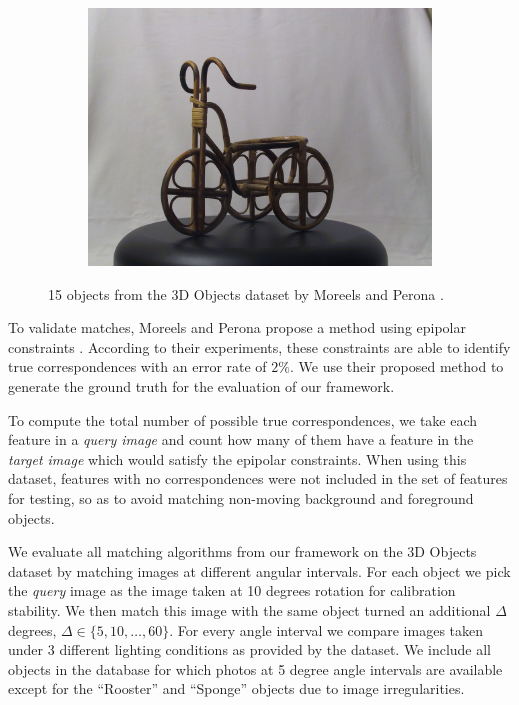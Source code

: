 \documentclass[runningheads]{llncs}
\begin{document}
\begin{figure}[htb]
\begin{subfigure}[t]{0.15\columnwidth}
        \includegraphics[width=1\columnwidth]{images/3d/15}
    \end{subfigure}%
    \vspace{1.5 mm}

    \caption{15 objects from the 3D Objects dataset by Moreels
    and Perona \cite{moreels2007evaluation}.}
    \label{fig:3d_objects}
\end{figure}

To validate matches, Moreels and Perona propose a method using epipolar constraints \cite[p.266]{moreels2007evaluation}.  According to their experiments, these constraints are able to identify true correspondences with an error rate of $2\%$. We use their proposed method to generate the ground truth for the evaluation of our framework.

To compute the total number of possible true correspondences, we take each feature in a \emph{query image} and count how many of them have a feature in the \emph{target image} which would satisfy the epipolar constraints. When using this dataset, features with no correspondences were not included in the set of features for testing, so as to avoid matching non-moving background and foreground objects.

We evaluate all matching algorithms from our framework on the 3D Objects dataset by matching images at different angular intervals. For each object we pick the \emph{query} image as the image taken at 10 degrees rotation for calibration stability.  We then match this image with the same object turned an additional $\Delta$ degrees, $\Delta \in \{5, 10, \ldots, 60\}$.  For every angle interval we compare images taken under 3 different lighting conditions as provided by the dataset. We include all objects in the database for which photos at 5 degree angle intervals are available except for the ``Rooster'' and ``Sponge'' objects due to image irregularities.
\end{document}
